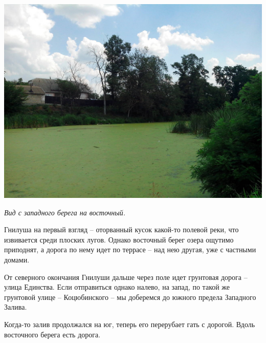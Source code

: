 \begin{center}
\includegraphics[width=\linewidth]{chast-gorodki/gnilusha/s_IMG_20140806_133353.jpg}

\textit{Вид с западного берега на восточный.}
\end{center}
\vspace*{\fill}
\newpage

Гнилуша на первый взгляд – оторванный кусок какой-то полевой реки, что извивается среди плоских лугов. Однако восточный берег озера ощутимо приподнят, а дорога по нему идет по террасе – над нею другая, уже с частными домами.



От северного окончания Гнилуши дальше через поле идет грунтовая дорога – улица Единства. Если отправиться однако налево, на запад, по такой же грунтовой улице – Коцюбинского – мы доберемся до южного предела Западного Залива.

Когда-то залив продолжался на юг, теперь его перерубает гать с дорогой. Вдоль восточного берега есть дорога. 

